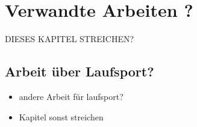 \chapter{Verwandte Arbeiten ?}
\label{sec:verwandt}
DIESES KAPITEL STREICHEN?

\section{Arbeit über Laufsport?}
\label{sec:verwandt:sec1}
\begin{itemize}
    \item andere Arbeit für laufsport?
    \item Kapitel sonst streichen
\end{itemize}